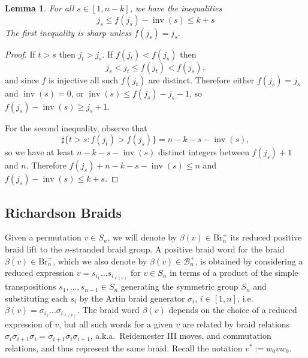 \documentclass[10pt]{amsart}
\theoremstyle{plain}
\newtheorem{lemma}[thm]{Lemma}
\theoremstyle{definition}
\theoremstyle{remark}
\numberwithin{equation}{section}
\newcommand{\cB}{\mathcal{B}}
\newcommand{\Br}{\mathrm{Br}}
\DeclareMathOperator{\inv}{inv}
\newcommand{\s}{\sigma}
\newcommand{\MG}[1]{{\color{teal}{{\bf Misha}: #1}}}
\begin{document}
\begin{lemma}
\label{lem: inv}
For all $s\in [1,n-k]$, we have the inequalities
$$
j_s\le f(j_s)-\inv(s)\le k+s
$$
The first inequality is sharp unless $f(j_s)=j_s$.
\end{lemma}

\begin{proof}
If $t>s$ then $j_t>j_s$. If $f(j_t)<f(j_s)$ then
$$
j_s<j_t\le f(j_t)<f(j_s),
$$
and since $f$ is injective all such $f(j_t)$ are distinct. Therefore either $f(j_s)=j_s$ and $\inv(s)=0$, or $\inv(s)\le f(j_s)-j_s-1$, so $f(j_s)-\inv(s)\ge j_s+1$.

For the second inequality, observe that 
\begin{equation}\label{eq: noninversions}
\sharp\{t>s: f(j_t)>f(j_s)\}=n-k-s-\inv(s),
\end{equation}
so we have at least $n-k-s-\inv(s)$ distinct integers between $f(j_s)+1$ and $n$. Therefore
$f(j_s)+n-k-s-\inv(s)\le n$ and $f(j_s)-\inv(s)\le k+s$. 
\end{proof}

\subsection{Richardson Braids}\label{ssec:RichardsonBraid} 


Given a permutation $v\in S_n$, we will denote by $\beta(v)\in\Br_n^+$ its reduced positive braid lift to the $n$-stranded braid group. A positive braid word for the braid $\beta(v)\in\Br_n^+$, which we also denote by $\beta(v)\in\cB_n^+$, %
 is obtained by considering a reduced expression $v=s_{i_1}\ldots s_{i_{\ell(v)}}$ for $v\in S_n$ in terms of a product of the simple transpositions $s_1,\ldots,s_{n-1}\in S_n$ generating the symmetric group $S_n$ and substituting each $s_i$ by the Artin braid generator $\sigma_i$, $i\in[1,n]$, i.e. $\beta(v)=\s_{i_1}\ldots \s_{i_{\ell(v)}}$. The braid word $\beta(v)$ depends on the choice of a reduced expression of $v$, but all such words for a given $v$ are related by braid relations $\sigma_i\sigma_{i+1}\sigma_i=\sigma_{i+1}\sigma_i\sigma_{i+1}$, a.k.a.~Reidemester III moves, and commutation relations, and thus represent the same braid. Recall the notation $v^* := w_0 v w_0$.
\end{document}
